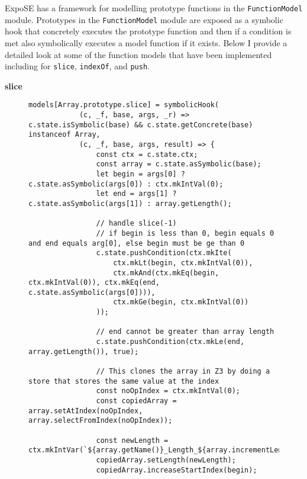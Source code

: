 \documentclass[]{final_report}
\begin{document}
ExpoSE has a framework for modelling prototype functions in the \lstinline|FunctionModel| module. Prototypes in the \lstinline|FunctionModel| module are exposed as a symbolic hook that concretely executes the prototype function and then if a condition is met also symbolically executes a model function if it exists. 
Below I provide a detailed look at some of the function models that have been implemented including for \lstinline|slice|, \lstinline|indexOf|, and \lstinline|push|.

\textbf{slice} \label{slice-function-model}
\begin{figure}[t]
\begin{lstlisting}
models[Array.prototype.slice] = symbolicHook(
            (c, _f, base, args, _r) => c.state.isSymbolic(base) && c.state.getConcrete(base) instanceof Array,
            (c, _f, base, args, result) => {
                const ctx = c.state.ctx;
                const array = c.state.asSymbolic(base);
                let begin = args[0] ? c.state.asSymbolic(args[0]) : ctx.mkIntVal(0);
                let end = args[1] ? c.state.asSymbolic(args[1]) : array.getLength();

                // handle slice(-1)
                // if begin is less than 0, begin equals 0 and end equals arg[0], else begin must be ge than 0
                c.state.pushCondition(ctx.mkIte(
                    ctx.mkLt(begin, ctx.mkIntVal(0)), 
                    ctx.mkAnd(ctx.mkEq(begin, ctx.mkIntVal(0)), ctx.mkEq(end, c.state.asSymbolic(args[0]))),
                    ctx.mkGe(begin, ctx.mkIntVal(0))
                ));

                // end cannot be greater than array length
                c.state.pushCondition(ctx.mkLe(end, array.getLength()), true);

                // This clones the array in Z3 by doing a store that stores the same value at the index
                const noOpIndex = ctx.mkIntVal(0);
                const copiedArray = array.setAtIndex(noOpIndex, array.selectFromIndex(noOpIndex));
                
                const newLength = ctx.mkIntVar(`${array.getName()}_Length_${array.incrementLengthCounter()}`);
                copiedArray.setLength(newLength);
                copiedArray.increaseStartIndex(begin);


\end{lstlisting}
\end{figure}
\end{document}

